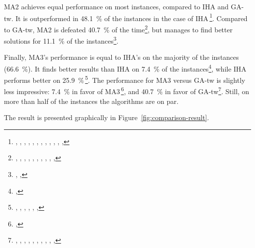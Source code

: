 \documentclass[thesis.tex]{subfiles}
\begin{document}
\gls{MA2} achieves equal performance on most instances, compared to \gls{IHA} and \gls{GA-tw}. It is outperformed in \SI{48.1}{\percent} of the instances in the case of \gls{IHA}\,\footnote{, , , , , , , , , , , , }. Compared to \gls{GA-tw}, \gls{MA2} is defeated \SI{40.7}{\percent} of the time\footnote{, , , , , , , , , , }, but manages to find better solutions for \SI{11.1}{\percent} of the instances\footnote{, , }.

Finally, \gls{MA3}'s performance is equal to \gls{IHA}'s on the majority of the instances (\SI{66.6}{\percent}). It finds better results than \gls{IHA} on \SI{7.4}{\percent} of the instances\footnote{, }, while \gls{IHA} performs better on \SI{25.9}{\percent}\,\footnote{, , , , , , }. The performance for \gls{MA3} versus \gls{GA-tw} is slightly less impressive: \SI{7.4}{\percent} in favor of \gls{MA3}\,\footnote{, }, and \SI{40.7}{\percent} in favor of \gls{GA-tw}\footnote{, , , , , , , , , , }. Still, on more than half of the instances the algorithms are on par.

The result is presented graphically in Figure~\vref{fig:comparison-result}.
\end{document}

